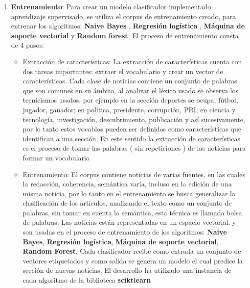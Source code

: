 \begin{enumerate}
  \item \textbf{Entrenamiento}: Para crear un modelo clasificador implementado aprendizaje supervisado, se utiliza el corpus de entrenamiento creado, para entrenar los algoritmos: \textbf{Naive Bayes} , \textbf{Regresión logística} , \textbf{Máquina de soporte vectorial} y \textbf{Random forest}. El proceso de entrenamiento consta de 4 pasos:\\

  \begin{itemize}

    \item Extracción de características: La extracción de características cuenta con dos tareas importantes: extraer el vocabulario y crear un vector de características. Cada clase de noticias contiene un conjunto de palabras que son comunes en su ámbito, al analizar el léxico usado se observa los tecnicismos usados, por ejemplo en la sección deportes se ocupa, fútbol, jugador, ganador; en política, presidente, corrupción, PRI; en ciencia y tecnología, investigación, descubrimiento, publicación y así sucesivamente, por lo tanto estos vocablos pueden ser definidos como características que identifican a una sección. En este sentido la extracción de características es el proceso de tomar las palabras ( sin repeticiones ) de las noticias para formar un vocabulario\\

    \item Entrenamiento: El corpus contiene noticias de varias fuentes, en  las cuales la redacción, coherencia, semántica varía, incluso en la edición de una misma noticia, por lo tanto en el entrenamiento se busca generalizar la clasificación de los artículos, analizando el texto como un conjunto de palabras, sin tomar en cuenta la semántica, esta técnica es llamada bolsa de palabras. Las noticias están representadas en un espacio vectorial, y son usadas en el proceso de entrenamiento de los algoritmos: \textbf{Naive Bayes}, \textbf{Regresión logística}, \textbf{Máquina de soporte vectorial}, \textbf{Random Forest}. Cada clasificador recibe como entrada un conjunto de vectores etiquetados y como salida se genera un modelo el cual predice la sección de nuevas noticias. El desarrollo ha utilizado una instancia de cada algoritmo de la biblioteca \textbf{sciktlearn}\\


\end{itemize}
\end{enumerate}
